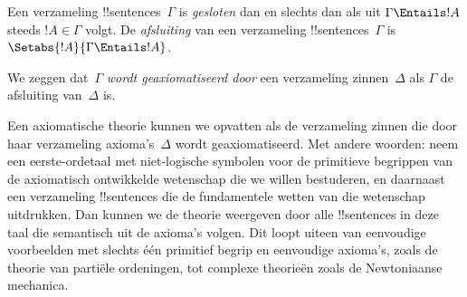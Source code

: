 \documentclass[openany]{memoir}
\begin{document}
\begin{defn}
Een verzameling !!{sentence}s~$\Gamma$ is \emph{gesloten} dan en
slechts dan als uit $\Gamma \Entails !A$ steeds $!A \in \Gamma$
volgt. De \emph{afsluiting} van een verzameling !!{sentence}s~$\Gamma$
is $\Setabs{!A}{\Gamma \Entails !A}$.

We zeggen dat~$\Gamma$ \emph{wordt geaxiomatiseerd door} een
verzameling zinnen~$\Delta$ als $\Gamma$ de afsluiting van~$\Delta$ is.
\end{defn}

\begin{explain}
Een axiomatische theorie kunnen we opvatten als de verzameling zinnen
die door haar verzameling axioma's~$\Delta$ wordt geaxiomatiseerd. Met
andere woorden: neem een eerste-ordetaal met niet-logische symbolen
voor de primitieve begrippen van de axiomatisch ontwikkelde wetenschap
die we willen bestuderen, en daarnaast een verzameling !!{sentence}s
die de fundamentele wetten van die wetenschap uitdrukken. Dan kunnen
we de theorie weergeven door alle !!{sentence}s in deze taal die
semantisch uit de axioma's volgen. Dit loopt uiteen van eenvoudige
voorbeelden met slechts één primitief begrip en eenvoudige axioma's,
zoals de theorie van partiële ordeningen, tot complexe theorieën zoals
de Newtoniaanse mechanica.


\end{explain}
\end{document}

